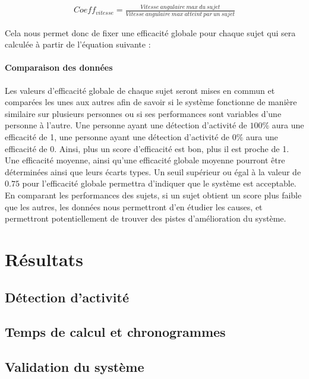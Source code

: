 \documentclass[letterpaper, twoside, 12pt, memoire, creativecommons, hyperref]{thETS}
\begin{document}
\begin{align}\label{eq:validCoeffVit}
   Coeff_{vitesse} = \frac{Vitesse\ angulaire\ max\ du\ sujet}{Vitesse\ angulaire\ max\ atteint\ par\ un\ sujet} 
\end{align}

Cela nous permet donc de fixer une efficacité globale pour chaque sujet qui sera calculée à partir de l’équation suivante : 


\subsubsection{Comparaison des données}

Les valeurs d’efficacité globale de chaque sujet seront mises en commun et comparées les unes aux autres afin de savoir si le système fonctionne de manière similaire sur plusieurs personnes ou si ses performances sont variables d’une personne à l’autre.
Une personne ayant une détection d’activité de $100\%$ aura une efficacité de 1, une personne ayant une détection d’activité de $0\%$ aura une efficacité de 0. Ainsi, plus un score d’efficacité est bon, plus il est proche de 1.
Une efficacité moyenne, ainsi qu’une efficacité globale moyenne pourront être déterminées ainsi que leurs écarts types. Un seuil supérieur ou égal à la valeur de $0.75$ pour l’efficacité globale permettra d’indiquer que le système est acceptable. En comparant les performances des sujets, si un sujet obtient un score plus faible que les autres, les données nous permettront d’en étudier les causes, et permettront potentiellement de trouver des pistes d’amélioration du système.

\chapter{Résultats}

\section{Détection d'activité}

\section{Temps de calcul et chronogrammes}

\section{Validation du système}
\end{document}
